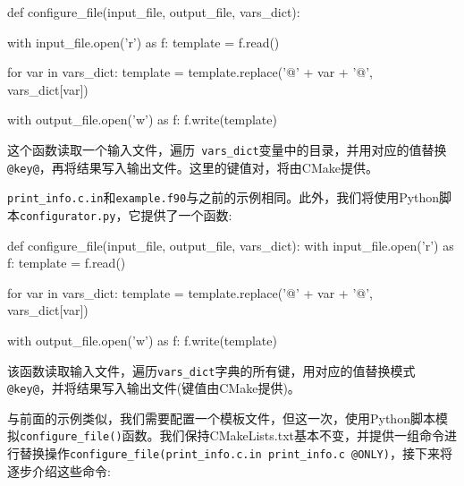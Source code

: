 \begin{codebox}[python]
def configure_file(input_file, output_file, vars_dict):

  with input_file.open('r') as f:
    template = f.read()

  for var in vars_dict: 
    template = template.replace('@' + var + '@', vars_dict[var])

  with output_file.open('w') as f:
    f.write(template)
\end{codebox}

这个函数读取一个输入文件，遍历\texttt{ vars\_dict}变量中的目录，并用对应的值替换\texttt{@key@}，再将结果写入输出文件。这里的键值对，将由CMake提供。


\texttt{print\_info.c.in}和\texttt{example.f90}与之前的示例相同。此外，我们将使用Python脚本\texttt{configurator.py}，它提供了一个函数:

\begin{codebox}[python]
def configure_file(input_file, output_file, vars_dict):
  with input_file.open('r') as f:
    template = f.read()
    
  for var in vars_dict:
    template = template.replace('@' + var + '@', vars_dict[var])
    
  with output_file.open('w') as f:
    f.write(template)
\end{codebox}

该函数读取输入文件，遍历\texttt{vars\_dict}字典的所有键，用对应的值替换模式\texttt{@key@}，并将结果写入输出文件(键值由CMake提供)。


与前面的示例类似，我们需要配置一个模板文件，但这一次，使用Python脚本模拟\texttt{configure\_file()}函数。我们保持CMakeLists.txt基本不变，并提供一组命令进行替换操作\texttt{configure\_file(print\_info.c.in print\_info.c @ONLY)}，接下来将逐步介绍这些命令:

